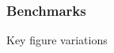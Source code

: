 
\begin{frame}[allowframebreaks]
\frametitle{Benchmarks}



\framebreak 

\begin{block}{Key figure variations}
\center
\resizebox{\linewidth}{!}{%
	
}
\end{block}
	
\end{frame}